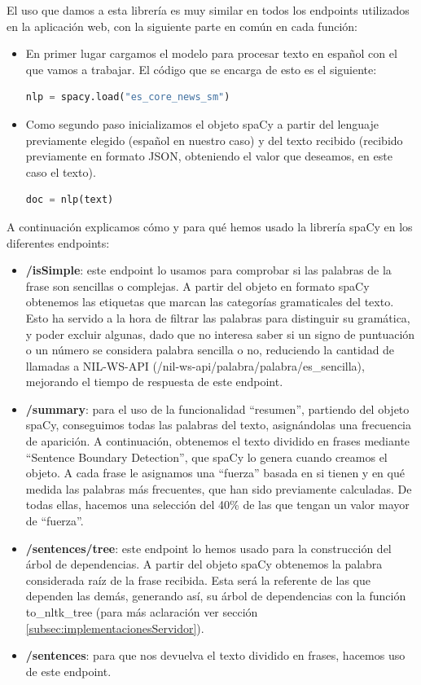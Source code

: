 El uso que damos a esta librería es muy similar en todos los endpoints utilizados en la aplicación web, con la siguiente parte en común en cada función:
\begin{itemize}
	\item En primer lugar cargamos el modelo para procesar texto en español con el que vamos a trabajar. El código que se encarga de esto es el siguiente:
	\begin{lstlisting}[language=python,firstnumber=1]
		nlp = spacy.load("es_core_news_sm")
	\end{lstlisting}
\item Como segundo paso inicializamos el objeto spaCy a partir del lenguaje previamente elegido (español en nuestro caso) y del texto recibido (recibido previamente en formato JSON, obteniendo el valor que deseamos, en este caso el texto).
	\begin{lstlisting}[language=python,firstnumber=1]
	doc = nlp(text)
\end{lstlisting}
\end{itemize}


A continuación explicamos cómo y para qué hemos usado la librería spaCy en los diferentes endpoints:

\begin{itemize}
	\item \textbf{/isSimple}: este endpoint lo usamos para comprobar si las palabras de la frase son sencillas o complejas. A partir del objeto en formato spaCy obtenemos las etiquetas que marcan las categorías gramaticales del texto. Esto ha servido a la hora de filtrar las palabras para distinguir su gramática, y poder excluir algunas, dado que no interesa saber si un signo de puntuación o un número se considera palabra sencilla o no, reduciendo la cantidad de llamadas a NIL-WS-API (/nil-ws-api/palabra/{palabra}/es\_sencilla), mejorando el tiempo de respuesta de este endpoint.
	
	\item \textbf{/summary}: para el uso de la funcionalidad ``resumen'', partiendo del objeto spaCy, conseguimos todas las palabras del texto, asignándolas una frecuencia de aparición. A continuación, obtenemos el texto dividido en frases mediante ``Sentence Boundary Detection'', que spaCy lo genera cuando creamos el objeto. A cada frase le asignamos una ``fuerza'' basada en si tienen y en qué medida las palabras más frecuentes, que han sido previamente calculadas. De todas ellas, hacemos una selección del 40\% de las que tengan un valor mayor de ``fuerza''.
	
	\item \textbf{/sentences/tree}: este endpoint lo hemos usado para la construcción del árbol de dependencias. A partir del objeto spaCy obtenemos la palabra considerada raíz de la frase recibida. Esta será la referente de las que dependen las demás, generando así, su árbol de dependencias con la función to\_nltk\_tree (para más aclaración ver sección \ref{subsec:implementacionesServidor}).
	
	\item \textbf{/sentences}: para que nos devuelva el texto dividido en frases, hacemos uso de este endpoint. 
\end{itemize}

